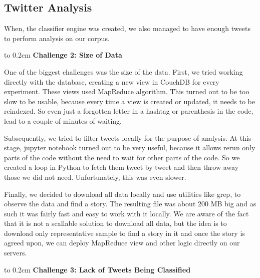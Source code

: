 \subsection{Twitter Analysis}

When, the classifier engine was created, we also managed to have enough tweets to perform analysis on our corpus.  

\vbox to 0.2cm{}
{\bf Challenge 2: Size of Data}

One of the biggest challenges was the size of the data. First, we tried working directly with the database,
creating a new view in CouchDB for every experiment. These views used MapReduce algorithm. This turned out to be too slow to be usable, because every
time a view is created or updated, it needs to be reindexed. So even just a forgotten letter
in a hashtag or parenthesis in the code, lead to a couple of minutes of waiting.


Subsequently, we tried to filter tweets locally for the purpose of analysis. At this stage,
jupyter notebook turned out to be very useful, because it allows rerun only parts of the code without
the need to wait for other parts of the code. So we created a loop
in Python to fetch them tweet by tweet and then throw away those we did not need. Unfortunately, this was even slower.

Finally, we decided to download all data locally and use utilities like grep, to observe the data and find a story. The resulting file was about 200 MB big and as such it was fairly fast and easy to work with it locally. We are aware of the fact that it is not a scallable solution to
download all data, but the idea is to download only representative sample to find a story in it and 
once the story is agreed upon, we can deploy MapReduce view and other logic directly on our servers.

\vbox to 0.2cm{}
{\bf Challenge 3: Lack of Tweets Being Classified}

